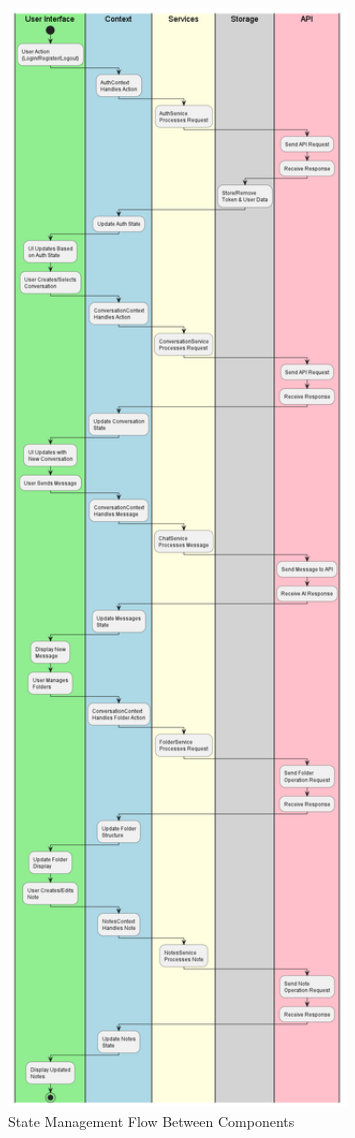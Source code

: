 \begin{figure}[h]
    \centering
    \includegraphics[width=0.8\textwidth]{./Chapter07/figures/state_management_flow.png}
    \caption{State Management Flow Between Components}
    \label{fig:state-management-flow}
\end{figure}

